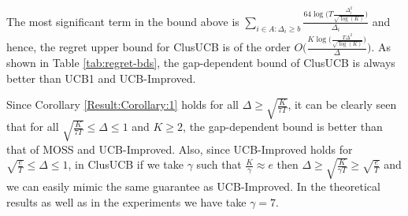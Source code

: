 
The most significant term in the bound above is $\sum_{i\in A:\Delta_{i}\geq b}\frac{64\log{\big(T\frac{\Delta_{i}^{2}}{\sqrt{\log (K)}}\big)}}{\Delta_{i}}$ and hence, the regret upper bound for ClusUCB is of the order $O\bigg(\frac{K\log \big(\frac{T\Delta^{2}}{\sqrt{\log (K)}}\big)}{\Delta}\bigg)$. As shown in Table \ref{tab:regret-bds}, the gap-dependent bound of ClusUCB is always better than UCB1 and UCB-Improved. 


Since Corollary \ref{Result:Corollary:1} holds for all $\Delta \geq \sqrt{\frac{K}{7T}} $, it can be clearly seen that for all $\sqrt{\frac{K}{7T}} \leq \Delta\leq 1$ and $K\geq 2$, the gap-dependent bound is better than that of MOSS and UCB-Improved. Also, since UCB-Improved holds for $\sqrt{\frac{e}{T}}\leq \Delta\leq 1$, in ClusUCB if we take $\gamma$ such that $\frac{K}{\gamma}\approx e$ then $\Delta\geq\sqrt{\frac{K}{\gamma T}}\geq \sqrt{\frac{e}{T}}$ and we can easily mimic the same guarantee as UCB-Improved. In the theoretical results as well as in the experiments we have take $\gamma =7$. 


